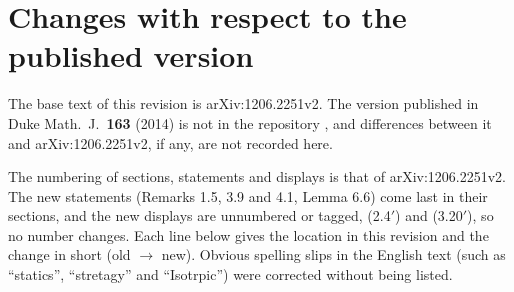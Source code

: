 \section{Changes with respect to the published version} \label{app:changes}

\begingroup\raggedright
The base text of this revision is arXiv:1206.2251v2. The version published in Duke Math.\ J.\ \textbf{163} (2014) is not in the repository \cite{Lean}, and differences between it and arXiv:1206.2251v2, if any, are not recorded here.

The numbering of sections, statements and displays is that of arXiv:1206.2251v2. The new statements (Remarks 1.5, 3.9 and 4.1, Lemma 6.6) come last in their sections, and the new displays are unnumbered or tagged, (2.4$'$) and (3.20$'$), so no number changes. Each line below gives the location in this revision and the change in short (old $\to$ new). Obvious spelling slips in the English text (such as ``statics'', ``stretagy'' and ``Isotrpic'') were corrected without being listed.

